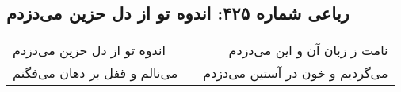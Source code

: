 \begin{center}
\section*{رباعی شماره ۴۲۵: اندوه تو از دل حزین می‌دزدم}
\label{sec:sh425}
\begin{longtable}{l p{0.5cm} r}
اندوه تو از دل حزین می‌دزدم
&&
نامت ز زبان آن و این می‌دزدم
\\
می‌نالم و قفل بر دهان می‌فگنم
&&
می‌گردیم و خون در آستین می‌دزدم
\\
\end{longtable}
\end{center}
